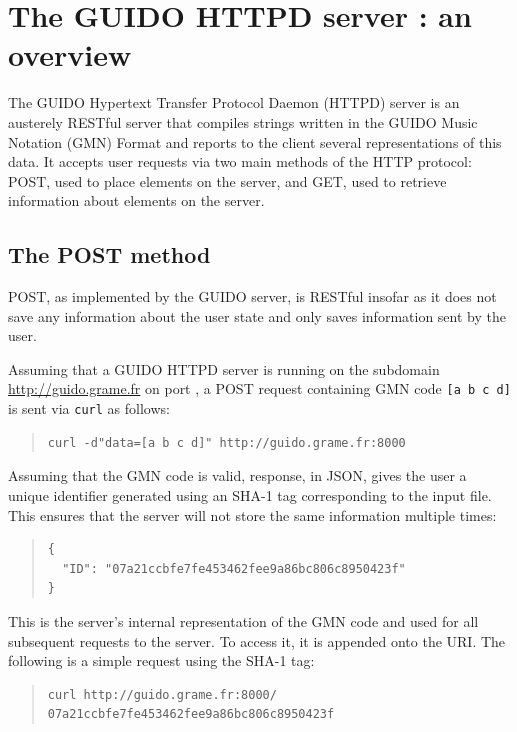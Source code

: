 \documentclass{article}
\newcommand{\verburl}[1]{
\begin{quote}
\begingroup
\fontsize{7.5pt}{12pt}\selectfont
#1
\endgroup
\end{quote}
}
\newcommand{\guidosize}{6pt}
\begin{document}
\section{The GUIDO HTTPD server : an overview}\label{section:overview}
The GUIDO Hypertext Transfer Protocol Daemon (HTTPD) server is an austerely RESTful server that compiles strings written in the GUIDO Music Notation (GMN) Format and reports to the client several representations of this data.  It accepts user requests via two main methods of the HTTP protocol: POST, used to place elements on the server, and GET, used to retrieve information about elements on the server.
\subsection{The POST method}\label{subsection:post}
POST, as implemented by the GUIDO server, is RESTful insofar as it does not save any information about the user state and only saves information sent by the user.\par
Assuming that a GUIDO HTTPD server is running on the subdomain \url{http://guido.grame.fr} on port , a POST request containing GMN code \verb=[a b c d]= is sent via \verb=curl= as follows:
\begin{quote}
\begingroup
\fontsize{\guidosize}{12pt}\selectfont
\begin{verbatim}
curl -d"data=[a b c d]" http://guido.grame.fr:8000
\end{verbatim}
\endgroup
\end{quote}
Assuming that the GMN code is valid, response, in JSON, gives the user a unique identifier generated using an SHA-1 tag corresponding to the input file.  This ensures that the server will not store the same information multiple times:
\begin{quote}
\begingroup
\fontsize{\guidosize}{12pt}\selectfont
\begin{verbatim}
{
  "ID": "07a21ccbfe7fe453462fee9a86bc806c8950423f"
}
\end{verbatim}
\endgroup
\end{quote}
This is the server's internal representation of the GMN code and used for all subsequent requests to the server.  To access it, it is appended onto the URI.  The following is a simple request using the SHA-1 tag:
\begin{quote}
\begingroup
\fontsize{\guidosize}{12pt}\selectfont
\begin{verbatim}
curl http://guido.grame.fr:8000/
07a21ccbfe7fe453462fee9a86bc806c8950423f
\end{verbatim}
\endgroup
\end{quote}
\end{document}
